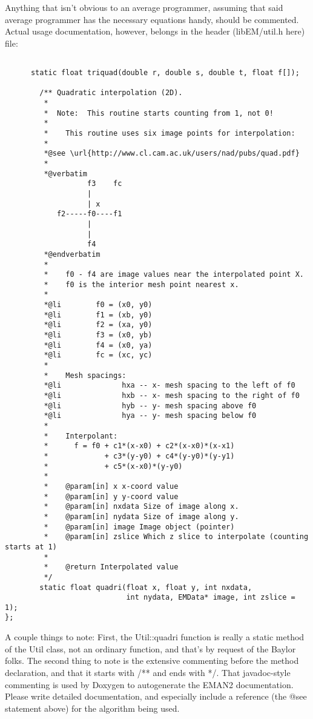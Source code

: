  Anything that isn't obvious to an average programmer, assuming that said average programmer has the necessary equations handy, should be commented. Actual usage documentation, however, belongs in the header (libEM/util.h here) file:
\begin{verbatim}

      static float triquad(double r, double s, double t, float f[]);

        /** Quadratic interpolation (2D).
         *
         *  Note:  This routine starts counting from 1, not 0!
         *
         *    This routine uses six image points for interpolation:
         *
         *@see \url{http://www.cl.cam.ac.uk/users/nad/pubs/quad.pdf}
         *
         *@verbatim
                   f3    fc
                   |
                   | x
            f2-----f0----f1
                   |
                   |
                   f4
         *@endverbatim
         *
         *    f0 - f4 are image values near the interpolated point X.
         *    f0 is the interior mesh point nearest x.
         *
         *@li        f0 = (x0, y0)
         *@li        f1 = (xb, y0)
         *@li        f2 = (xa, y0)
         *@li        f3 = (x0, yb)
         *@li        f4 = (x0, ya)
         *@li        fc = (xc, yc)
         *
         *    Mesh spacings: 
         *@li              hxa -- x- mesh spacing to the left of f0
         *@li              hxb -- x- mesh spacing to the right of f0
         *@li              hyb -- y- mesh spacing above f0
         *@li              hya -- y- mesh spacing below f0
         *
         *    Interpolant:
         *      f = f0 + c1*(x-x0) + c2*(x-x0)*(x-x1)
         *             + c3*(y-y0) + c4*(y-y0)*(y-y1)
         *             + c5*(x-x0)*(y-y0)
         *
         *    @param[in] x x-coord value
         *    @param[in] y y-coord value
         *    @param[in] nxdata Size of image along x.
         *    @param[in] nydata Size of image along y.
         *    @param[in] image Image object (pointer)
         *    @param[in] zslice Which z slice to interpolate (counting starts at 1)
         *
         *    @return Interpolated value
         */
        static float quadri(float x, float y, int nxdata, 
                            int nydata, EMData* image, int zslice = 1);
};

\end{verbatim}


 A couple things to note: First, the Util::quadri function is really a static method of the Util class, not an ordinary function, and that's by request of the Baylor folks. The second thing to note is the extensive commenting before the method declaration, and that it starts with /** and ends with */. That javadoc-style commenting is used by Doxygen to autogenerate the EMAN2 documentation. Please write detailed documentation, and especially include a reference (the @see statement above) for the algorithm being used.


